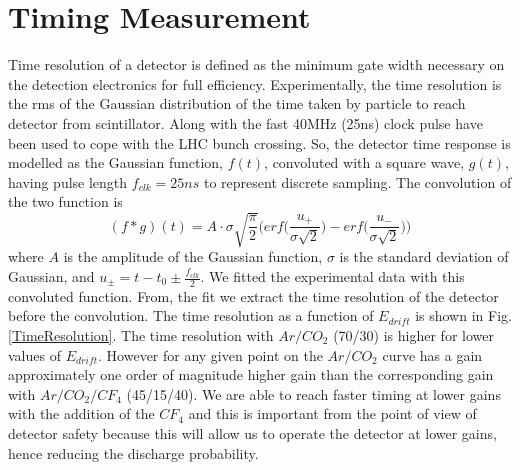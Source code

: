 \section{Timing Measurement}
Time resolution of a detector is defined as the minimum gate width necessary on the detection electronics for full efficiency. Experimentally, the time resolution is the rms of the Gaussian distribution of the time taken by particle to reach detector from scintillator. Along with the fast 40MHz (25ns) clock pulse have been used to cope with the LHC bunch crossing. So, the detector time response is modelled as the Gaussian function, $f(t)$, convoluted with a square wave, $g(t)$, having pulse length $f_{clk}=25ns$ to represent discrete sampling. 
The convolution of the two function is
\begin{equation}
(f*g)(t) = A \cdot \sigma \sqrt{\frac{\pi}{2}}\Big(erf\Big(\frac{u_{+}}{\sigma\sqrt{2}}\Big)-erf\Big(\frac{u_{-}}{\sigma\sqrt{2}}\Big)\Big)
\end{equation}
where $A$ is the amplitude of the Gaussian function, $\sigma$ is the standard deviation of Gaussian, and $u_{\pm}= t-t_0\pm\frac{f_{clk}}{2}$. 
We fitted the experimental data with this convoluted function. From, the fit we extract the time resolution of the detector before the convolution. The time resolution as a function of $E_{drift}$ is shown in Fig. \ref{TimeResolution}. The time resolution with $Ar/CO_2$ (70/30) is higher for lower values of $E_{drift}$. However for any given point on the $Ar/CO_2$ curve has a gain approximately one order of magnitude higher gain than the corresponding gain with $Ar/CO_2/CF_4$ (45/15/40).  We are able to reach faster timing at lower gains with the addition of the $CF_4$ and this is important from the point of view of detector safety because this will allow us to operate the detector at lower gains, hence reducing the discharge probability.

